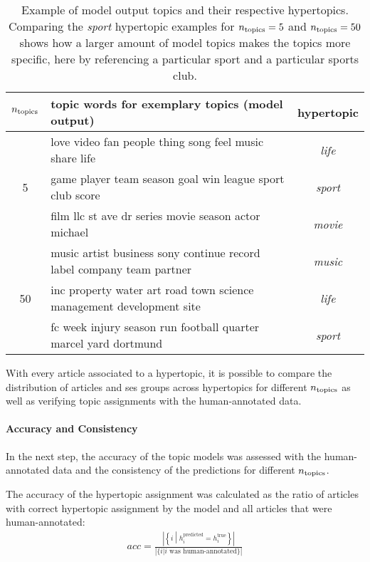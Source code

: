 \begin{table}
    \centering
    \begin{tabular}{clc}
        \toprule
        $n_\text{topics}$ & topic words for exemplary topics (model output) & hypertopic \\
        \toprule 
        \multirow{3}{*}{5} & love video fan people thing song feel music share life & \textit{life}\\
        & game player team season goal win league sport club score & \textit{sport}\\
        & film llc st ave dr series movie season actor michael & \textit{movie}\\
        \midrule
        \multirow{3}{*}{50} & music artist business sony continue record label company team partner & \textit{music} \\
        & inc property water art road town science management development site & \textit{life} \\
        & fc week injury season run football quarter marcel yard dortmund & \textit{sport} \\
        \bottomrule
    \end{tabular}
    \caption{Example of model output topics and their respective hypertopics. Comparing the \textit{sport} hypertopic examples for $n_\text{topics} = 5$ and $n_\text{topics} = 50$ shows how a larger amount of model topics makes the topics more specific, here by referencing a particular sport and a particular sports club.}\label{tab:hypertopics}
\end{table}

With every article associated to a hypertopic, it is possible to compare the distribution of articles and \gls{ses} groups across hypertopics for different $n_\text{topics}$ as well as verifying topic assignments with the human-annotated data.

\paragraph{Accuracy and Consistency}
In the next step, the accuracy of the topic models was assessed with the human-annotated data and the consistency of the predictions for different $n_\text{topics}$.

The accuracy of the hypertopic assignment was calculated as the ratio of articles with correct hypertopic assignment by the model and all articles that were human-annotated:
\begin{align}
    acc = \frac{
        \left|
            \left\{i\middle|h_{i}^\text{predicted} = h_{i}^\text{true}\right\}
        \right|
    }{
        \left|
            \{{i|i \text{ was human-annotated}}\}
        \right|
    }
\end{align}

